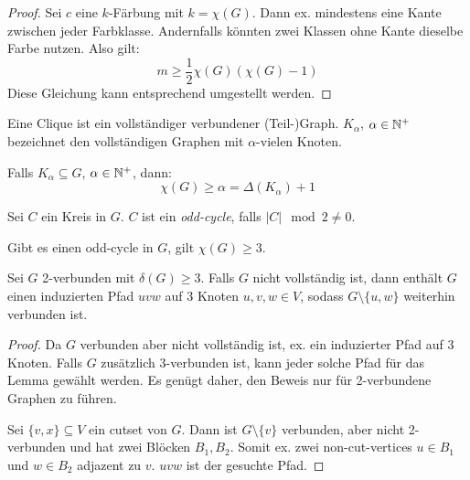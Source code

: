 \begin{proof}
    Sei $ c $ eine $ k $-Färbung mit $ k = \chi(G) $.
    Dann ex. mindestens eine Kante zwischen jeder Farbklasse.
    Andernfalls könnten zwei Klassen ohne Kante dieselbe Farbe nutzen.
    Also gilt:
    \begin{equation*}
        m \geq \frac{1}{2} \chi(G) (\chi(G) - 1)
    \end{equation*}
    Diese Gleichung kann entsprechend umgestellt werden.
\end{proof}

\begin{definition}[Clique]
    Eine Clique ist ein vollständiger verbundener (Teil-)Graph.
    $ K_\alpha $, $ \alpha \in \mathbb{N}^+ $ bezeichnet den vollständigen Graphen mit $ \alpha $-vielen Knoten.
\end{definition}

\begin{proposition}
    Falls $ K_\alpha \subseteq G $, $ \alpha \in \mathbb{N}^+ $, dann:
    \begin{equation*}
        \chi(G) \geq \alpha = \Delta(K_\alpha) + 1
    \end{equation*}
\end{proposition}

\begin{definition}
    Sei $ C $ ein Kreis in $ G $.
    $ C $ ist ein \textit{odd-cycle}, falls $ |C| \mod 2 \ne 0 $.
\end{definition}

\begin{proposition}
    Gibt es einen odd-cycle in $ G $, gilt $ \chi(G) \geq 3 $.
\end{proposition}

\begin{lemma}
    \label{lem:min-deg-3-connected}
    Sei $ G $ 2-verbunden mit $ \delta(G) \geq 3 $.
    Falls $ G $ nicht vollständig ist, dann enthält $ G $ einen induzierten Pfad  $uvw $ auf 3 Knoten $ u, v, w \in V $, sodass $ G \setminus \{ u, w \} $ weiterhin verbunden ist.
\end{lemma}

\begin{proof}
    Da $ G $ verbunden aber nicht vollständig ist, ex. ein induzierter Pfad auf 3 Knoten.
    Falls $ G $ zusätzlich 3-verbunden ist, kann jeder solche Pfad für das Lemma gewählt werden.
    Es genügt daher, den Beweis nur für 2-verbundene Graphen zu führen.

    Sei $ \{ v, x\} \subseteq V $ ein cutset von $ G $.
    Dann ist $ G \setminus \{ v \} $ verbunden, aber nicht 2-verbunden und hat zwei Blöcken $ B_1, B_2 $.
    Somit ex. zwei non-cut-vertices $ u \in B_1 $ und $ w \in B_2 $ adjazent zu $ v $.
    $ uvw $ ist der gesuchte Pfad.
\end{proof}

